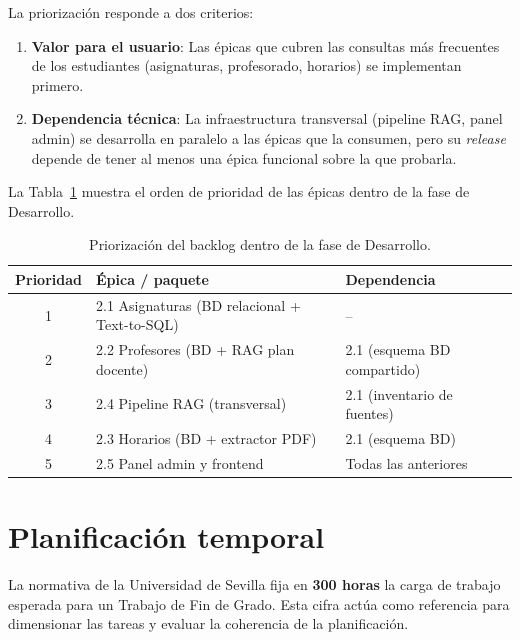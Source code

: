 La priorización responde a dos criterios:

\begin{enumerate}
    \item \textbf{Valor para el usuario}: Las épicas que cubren las consultas más frecuentes de los estudiantes (asignaturas, profesorado, horarios) se implementan primero.
    \item \textbf{Dependencia técnica}: La infraestructura transversal (pipeline RAG, panel admin) se desarrolla en paralelo a las épicas que la consumen, pero su \textit{release} depende de tener al menos una épica funcional sobre la que probarla.
\end{enumerate}

La Tabla~\ref{tab:backlog-prioridad} muestra el orden de prioridad de las épicas dentro de la fase de Desarrollo.

\begin{table}[hbtp]
\centering
\begin{tabular}{|c|l|l|}
\hline
\textbf{Prioridad} & \textbf{Épica / paquete} & \textbf{Dependencia} \\ \hline
1 & 2.1 Asignaturas (BD relacional + Text-to-SQL) & -- \\ \hline
2 & 2.2 Profesores (BD + RAG plan docente)        & 2.1 (esquema BD compartido) \\ \hline
3 & 2.4 Pipeline RAG (transversal)                & 2.1 (inventario de fuentes) \\ \hline
4 & 2.3 Horarios (BD + extractor PDF)             & 2.1 (esquema BD) \\ \hline
5 & 2.5 Panel admin y frontend                    & Todas las anteriores \\ \hline
\end{tabular}
\caption{Priorización del backlog dentro de la fase de Desarrollo.}
\label{tab:backlog-prioridad}
\end{table}


\section{Planificación temporal}\label{sec:planificacion-temporal}

La normativa de la Universidad de Sevilla fija en \textbf{300 horas} la carga de trabajo esperada para un Trabajo de Fin de Grado. Esta cifra actúa como referencia para dimensionar las tareas y evaluar la coherencia de la planificación.

